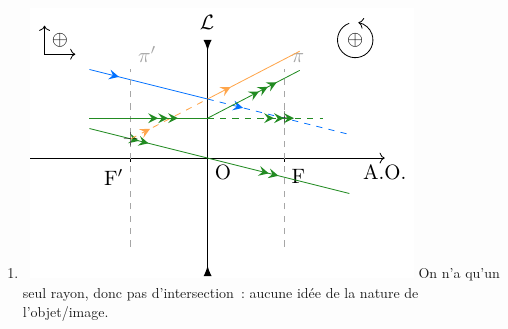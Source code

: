\documentclass[../../main/main.tex]{subfiles}
\begin{document}
{\begin{multicols}{2}
\begin{enumerate}
			      Ici, l'objet est \underline{réel} et donne un faisceau émergent
			      \underline{divergent}, donnant donc une image \underline{virtuelle}.
			\item ~\smallbreak\includegraphics[width=\linewidth]{divQQE}
			      On n'a qu'un seul rayon, donc pas d'intersection~: aucune idée de la
			      nature de l'objet/image.
		\end{enumerate}
	\end{multicols}
}
\end{document}
